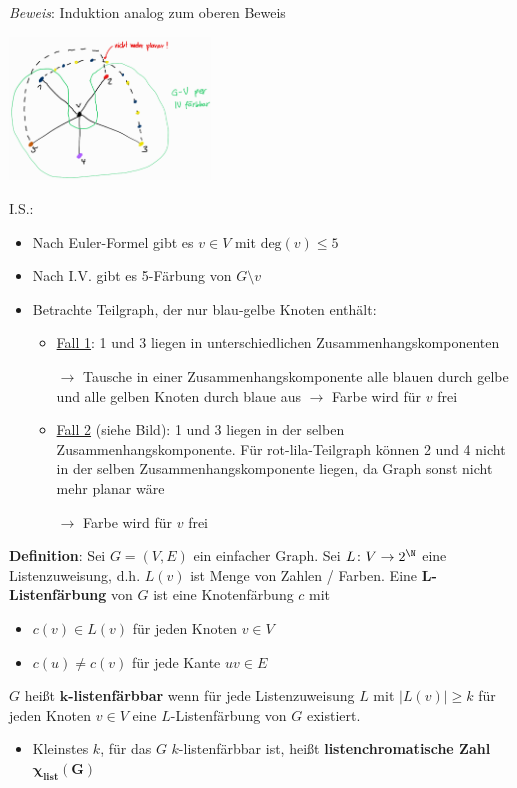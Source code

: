 \textit{Beweis}: Induktion analog zum oberen Beweis
\begin{center}
	\includegraphics[width=0.4\textwidth]{images/5-f.png}
\end{center}

I.S.:
\begin{itemize}
	\item Nach Euler-Formel gibt es $v\in V$ mit $\text{deg}(v)\leq 5$
	\item Nach I.V. gibt es 5-Färbung von $G\setminus v$
	\item Betrachte Teilgraph, der nur blau-gelbe Knoten enthält:
	\begin{itemize}
		\item \underline{Fall 1}: 1 und 3 liegen in unterschiedlichen Zusammenhangskomponenten
		
		$\rightarrow$ Tausche in einer Zusammenhangskomponente alle blauen durch gelbe und alle gelben Knoten durch blaue aus $\rightarrow$ Farbe wird für $v$ frei
		\item \underline{Fall 2} (siehe Bild): 1 und 3 liegen in der selben Zusammenhangskomponente. Für rot-lila-Teilgraph können 2 und 4 nicht in der selben Zusammenhangskomponente liegen, da Graph sonst nicht mehr planar wäre
		
		$\rightarrow$ Farbe wird für $v$ frei
	\end{itemize}
\end{itemize}
\bigskip
\textbf{Definition}: Sei $G=(V,E)$ ein einfacher Graph. Sei $L\colon V\rightarrow 2^\N$ eine Listenzuweisung, d.h. $L(v)$ ist Menge von Zahlen / Farben. Eine \textbf{$\boldsymbol{L}$-Listenfärbung} von $G$ ist eine Knotenfärbung $c$ mit
\begin{itemize}
	\item $c(v)\in L(v)$ für jeden Knoten $v\in V$
	\item $c(u)\neq c(v)$ für jede Kante $uv\in E$
\end{itemize}
$G$ heißt \textbf{$\boldsymbol{k}$-listenfärbbar} wenn für jede Listenzuweisung $L$ mit $|L(v)|\geq k$ für jeden Knoten $v\in V$ eine $L$-Listenfärbung von $G$ existiert.
\begin{itemize}
	\item Kleinstes $k$, für das $G$ $k$-listenfärbbar ist, heißt \textbf{listenchromatische Zahl $\boldsymbol{\chi_{\text{list}}(G)}$}
\end{itemize}
